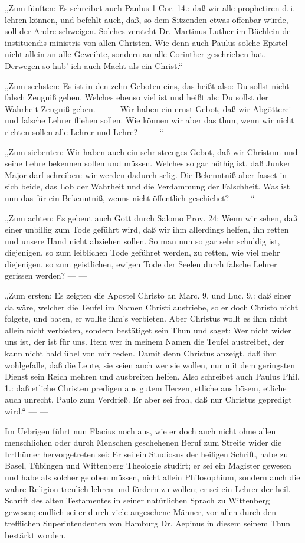 „Zum fünften: Es schreibet auch Paulus 1 Cor. 14.: daß wir alle prophetiren d.\,i. lehren können, und befehlt
auch, daß, so dem Sitzenden etwas offenbar würde, soll der Andre schweigen. Solches versteht Dr. Martinus Luther
im Büchlein de instituendis ministris von allen Christen. Wie denn auch Paulus solche Epistel nicht allein an
alle Geweihte, sondern an alle Corinther geschrieben hat. Derwegen so hab’ ich auch Macht als ein Christ.“

„Zum sechsten: Es ist in den zehn Geboten eins, das heißt also: Du sollst nicht falsch Zeugniß geben. Welches
ebenso viel ist und heißt als: Du sollst der Wahrheit Zeugniß geben. — — Wir haben ein ernst Gebot, daß
wir Abgötterei und falsche Lehrer fliehen sollen. Wie können wir aber das thun, wenn wir nicht richten sollen
alle Lehrer und Lehre? — —“

„Zum siebenten: Wir haben auch ein sehr strenges Gebot, daß wir Christum und seine Lehre bekennen sollen und
müssen. Welches so gar nöthig ist, daß Junker Major darf schreiben: wir werden dadurch selig. Die Bekenntniß aber
fasset in sich beide, das Lob der Wahrheit und die Verdammung der Falschheit. Was ist nun das für ein Bekenntniß,
wenns nicht öffentlich geschiehet? — —“

„Zum achten: Es gebeut auch Gott durch Salomo Prov. 24: Wenn
wir sehen, daß einer unbillig zum Tode geführt wird, daß wir ihm allerdings helfen, ihn retten und unsere Hand
nicht abziehen sollen. So man nun so gar sehr schuldig ist, diejenigen, so zum leiblichen Tode geführet werden,
zu retten, wie viel mehr diejenigen, so zum geistlichen, ewigen Tode der Seelen durch falsche Lehrer gerissen
werden? — —

„Zum ersten: Es zeigten die Apostel Christo an Marc. 9. und Luc. 9.: daß einer da wäre, welcher die Teufel im
Namen Christi austriebe, so er doch Christo nicht folgete, und baten, er wollte ihm’s verbieten. Aber Christus
wollt es ihm nicht allein nicht verbieten, sondern bestätiget sein Thun und saget: Wer nicht wider uns ist, der
ist für uns. Item wer in meinem Namen die Teufel austreibet, der kann nicht bald übel von mir reden. Damit denn
Christus anzeigt, daß ihm wohlgefalle, daß die Leute, sie seien auch wer sie wollen, nur mit dem geringsten Dienst
sein Reich mehren und ausbreiten helfen. Also schreibet auch Paulus Phil. 1.: daß etliche Christen predigen aus
gutem Herzen, etliche aus bösem, etliche auch unrecht, Paulo zum Verdrieß. Er aber sei froh, daß nur Christus
gepredigt wird.“ — —

Im Uebrigen führt nun Flacius noch aus, wie er doch auch nicht ohne allen menschlichen oder durch Menschen
geschehenen Beruf zum Streite wider die Irrthümer hervorgetreten sei: Er sei ein Studiosus der heiligen Schrift,
habe zu Basel, Tübingen und Wittenberg Theologie studirt; er sei ein Magister gewesen und habe als solcher geloben
müssen, nicht allein Philosophium, sondern auch die wahre Religion treulich lehren und fördern zu wollen; er sei
ein Lehrer der heil. Schrift des alten Testamentes in seiner natürlichen Sprach zu Wittenberg gewesen; endlich
sei er durch viele angesehene Männer, vor allen durch den trefflichen Superintendenten von Hamburg Dr. Aepinus
in diesem seinem Thun bestärkt worden.

